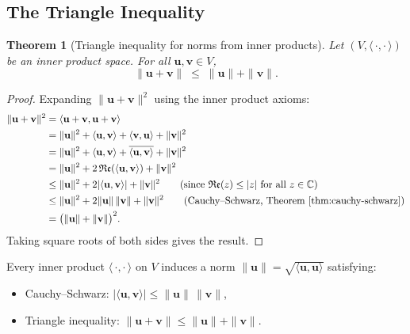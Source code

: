 \documentclass[11pt, a4paper, notitlepage]{report}
\newtheorem{theorem}{Theorem}[section]
\theoremstyle{definition}
\theoremstyle{remark}
\begin{document}
\subsection{The Triangle Inequality}
\label{subsec:triangle-ineq}

\begin{theorem}[Triangle inequality for norms from inner products]
\label{thm:triangle-ineq}
Let $(V,\langle\,\cdot,\cdot\,\rangle)$ be an inner product space.
For all $\mathbf{u},\mathbf{v}\in V$,
\[
  \|\mathbf{u}+\mathbf{v}\| \;\leq\; \|\mathbf{u}\| + \|\mathbf{v}\|.
\]
\end{theorem}

\begin{proof}
Expanding $\|\mathbf{u}+\mathbf{v}\|^2$ using the inner product axioms:
\begin{align*}
  \|\mathbf{u}+\mathbf{v}\|^2
  &= \langle\mathbf{u}+\mathbf{v},\mathbf{u}+\mathbf{v}\rangle \\
  &= \|\mathbf{u}\|^2 + \langle\mathbf{u},\mathbf{v}\rangle
     + \langle\mathbf{v},\mathbf{u}\rangle + \|\mathbf{v}\|^2 \\
  &= \|\mathbf{u}\|^2 + \langle\mathbf{u},\mathbf{v}\rangle
     + \overline{\langle\mathbf{u},\mathbf{v}\rangle} + \|\mathbf{v}\|^2 \\
  &= \|\mathbf{u}\|^2 + 2\,\mathfrak{Re}(\langle\mathbf{u},\mathbf{v}\rangle) + \|\mathbf{v}\|^2 \\
  &\leq \|\mathbf{u}\|^2 + 2|\langle\mathbf{u},\mathbf{v}\rangle| + \|\mathbf{v}\|^2
    \qquad (\text{since } \mathfrak{Re}(z) \leq |z| \text{ for all } z \in \mathbb{C}) \\
  &\leq \|\mathbf{u}\|^2 + 2\|\mathbf{u}\|\,\|\mathbf{v}\| + \|\mathbf{v}\|^2
    \qquad (\text{Cauchy--Schwarz, Theorem~\ref{thm:cauchy-schwarz}}) \\
  &= \bigl(\|\mathbf{u}\| + \|\mathbf{v}\|\bigr)^2.
\end{align*}
Taking square roots of both sides gives the result.
\end{proof}

\begin{keyresult}[title={Key Result: Inner Product Geometry}]
Every inner product $\langle\,\cdot,\cdot\,\rangle$ on $V$ induces a norm
$\|\mathbf{u}\| = \sqrt{\langle\mathbf{u},\mathbf{u}\rangle}$ satisfying:
\begin{itemize}
  \item Cauchy--Schwarz: $|\langle\mathbf{u},\mathbf{v}\rangle| \leq \|\mathbf{u}\|\,\|\mathbf{v}\|$,
  \item Triangle inequality: $\|\mathbf{u}+\mathbf{v}\| \leq \|\mathbf{u}\|+\|\mathbf{v}\|$.
\end{itemize}
\end{keyresult}
\end{document}
